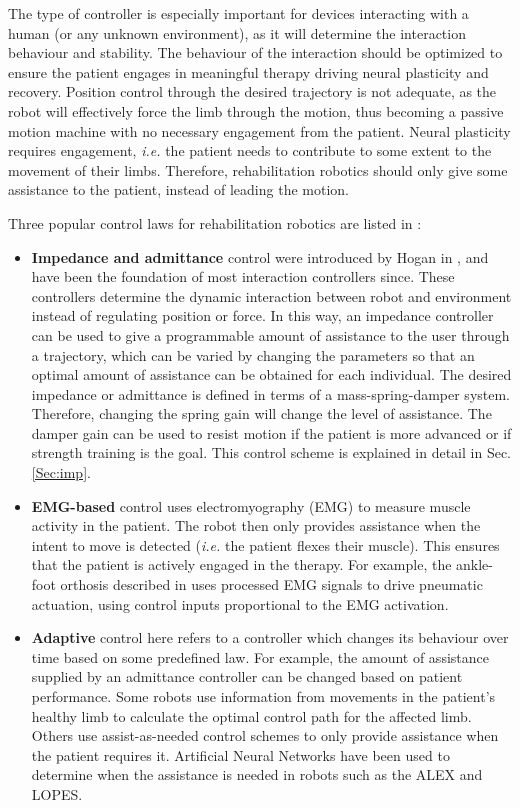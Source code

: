 \documentclass[12pt]{report}
\begin{document}
	The type of controller is especially important for devices interacting with a human (or any unknown environment), as it will determine the interaction behaviour and stability. The behaviour of the interaction should be optimized to ensure the patient engages in meaningful therapy driving neural plasticity and recovery. Position control through the desired trajectory is not adequate, as the robot will effectively force the limb through the motion, thus becoming a passive motion machine with no necessary engagement from the patient. Neural plasticity requires engagement, \textit{i.e.} the patient needs to contribute to some extent to the movement of their limbs. Therefore, rehabilitation robotics should only give some assistance to the patient, instead of leading the motion. 
	
	Three popular control laws for rehabilitation robotics are listed in \cite{Meng2015}:
	
\begin{itemize}

	\item \textbf{Impedance and admittance} control were introduced by Hogan in \cite{Hogan1985}, and have been the foundation of most interaction controllers since. These controllers determine the dynamic interaction between robot and environment instead of regulating position or force. In this way, an impedance controller can be used to give a programmable amount of assistance to the user through a trajectory, which can be varied by changing the parameters so that an optimal amount of assistance can be obtained for each individual. The desired impedance or admittance is defined in terms of a mass-spring-damper system. Therefore, changing the spring gain will change the level of assistance. The damper gain can be used to resist motion if the patient is more advanced or if strength training is the goal. This control scheme is explained in detail in Sec. \ref{Sec:imp}.
	
	\item \textbf{EMG-based} control uses electromyography (EMG) to measure muscle activity in the patient. The robot then only provides assistance when the intent to move is detected (\textit{i.e.} the patient flexes their muscle). This ensures that the patient is actively engaged in the therapy. For example, the ankle-foot orthosis described in \cite{Ferris2006} uses processed EMG signals to drive pneumatic actuation, using control inputs proportional to the EMG activation. 
	
	\item \textbf{Adaptive} control here refers to a controller which changes its behaviour over time based on some predefined law. For example, the amount of assistance supplied by an admittance controller can be changed based on patient performance. Some robots use information from movements in the patient's healthy limb to calculate the optimal control path for the affected limb. Others use assist-as-needed control schemes to only provide assistance when the patient requires it. Artificial Neural Networks have been used to determine when the assistance is needed in robots such as the ALEX and LOPES.
	
\end{itemize}
		
\end{document}
